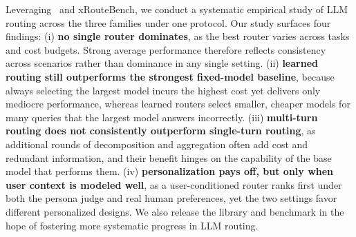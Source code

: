 Leveraging \method\ and xRouteBench, we conduct a systematic empirical study of LLM routing across the three families under one protocol. Our study surfaces four findings:
(i) \textbf{no single router dominates}, as the best router varies across tasks and cost budgets. Strong average performance therefore reflects consistency across scenarios rather than dominance in any single setting. (ii) \textbf{learned routing still outperforms the strongest fixed-model baseline}, because always selecting the largest model incurs the highest cost yet delivers only mediocre performance, whereas learned routers select smaller, cheaper models for many queries that the largest model answers incorrectly. (iii) \textbf{multi-turn routing does not consistently outperform single-turn routing}, as additional rounds of decomposition and aggregation often add cost and redundant information, and their benefit hinges on the capability of the base model that performs them. (iv) \textbf{personalization pays off, but only when user context is modeled well}, as a user-conditioned router ranks first under both the persona judge and real human preferences, yet the two settings favor different personalized designs.
We also release the library and benchmark in the hope of fostering more systematic progress in LLM routing.

